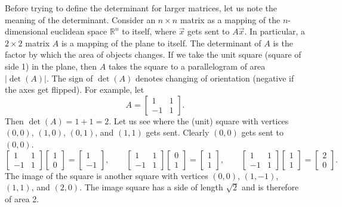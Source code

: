 \documentclass{ximera}
\begin{document}
Before trying to define the determinant for larger matrices, let us note the meaning of the determinant.  Consider an $n \times n$ matrix as a mapping of the $n$-dimensional euclidean space ${\mathbb{R}}^n$ to itself, where $\vec{x}$ gets sent to $A \vec{x}$. In particular, a $2 \times 2$ matrix $A$ is a mapping of the plane to itself.  The determinant of $A$ is the factor by which the area of objects changes. If we take the unit square (square of side 1) in the plane, then $A$ takes the square to a parallelogram of area $\lvert\det(A)\rvert$.  The sign of $\det(A)$ denotes changing of orientation (negative if the axes get flipped).  For example, let
\begin{equation*}
    A =
    \begin{bmatrix}
        1 & 1 \\
        -1 & 1
    \end{bmatrix} .
\end{equation*}
Then $\det(A) = 1+1 = 2$.  Let us see where the (unit) square with vertices $(0,0)$, $(1,0)$, $(0,1)$, and $(1,1)$ gets sent.  Clearly $(0,0)$ gets sent to $(0,0)$.  
\begin{equation*}
    \begin{bmatrix}
        1 & 1 \\
        -1 & 1
    \end{bmatrix}
    \begin{bmatrix}
        1 \\ 
        0
    \end{bmatrix} =
    \begin{bmatrix}
        1 \\
        -1 
    \end{bmatrix}
    , \qquad
    \begin{bmatrix}
        1 & 1 \\
        -1 & 1
    \end{bmatrix}
    \begin{bmatrix}
        0 \\ 
        1
    \end{bmatrix} =
    \begin{bmatrix}
        1 \\
        1 
    \end{bmatrix}
    , \qquad
    \begin{bmatrix}
        1 & 1 \\
        -1 & 1
    \end{bmatrix}
    \begin{bmatrix}
        1 \\ 
        1
    \end{bmatrix} =
    \begin{bmatrix}
        2 \\
        0 
    \end{bmatrix}.
\end{equation*}
The image of the square is another square with vertices $(0,0)$, $(1,-1)$, $(1,1)$, and $(2,0)$.  The image square has a side of length $\sqrt{2}$ and is therefore of area 2.
\end{document}
